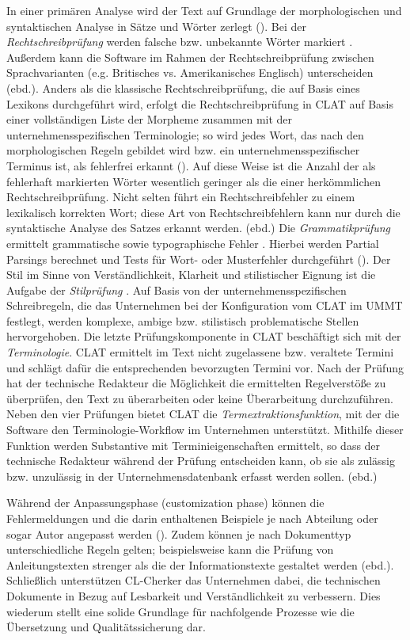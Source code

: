 In einer primären Analyse wird der Text auf Grundlage der morphologischen und syntaktischen Analyse in Sätze und Wörter zerlegt (\citealt{HallerSchütz2001}). Bei der \textit{Rechtschreibprüfung} werden falsche bzw. unbekannte Wörter markiert \citep{Rösener2010}. Außerdem kann die Software im Rahmen der Rechtschreibprüfung zwischen Sprachvarianten (e.g. Britisches vs. Amerikanisches Englisch) unterscheiden (ebd.). Anders als die klassische Rechtschreibprüfung, die auf Basis eines Lexikons durchgeführt wird, erfolgt die Rechtschreibprüfung in CLAT auf Basis einer vollständigen Liste der Morpheme zusammen mit der unternehmensspezifischen Terminologie; so wird jedes Wort, das nach den morphologischen Regeln gebildet wird bzw. ein unternehmensspezifischer Terminus ist, als fehlerfrei erkannt (\citealt{HallerSchütz2001}). Auf diese Weise ist die Anzahl der als fehlerhaft markierten Wörter wesentlich geringer als die einer herkömmlichen Rechtschreibprüfung. Nicht selten führt ein Rechtschreibfehler zu einem lexikalisch korrekten Wort; diese Art von Rechtschreibfehlern kann nur durch die syntaktische Analyse des Satzes erkannt werden. (ebd.) Die \textit{Grammatikprüfung} ermittelt grammatische sowie typographische Fehler \citep{Rösener2010}. Hierbei werden Partial Parsings berechnet und Tests für Wort- oder Musterfehler durchgeführt (\citealt{HallerSchütz2001}). Der Stil im Sinne von Verständlichkeit, Klarheit und stilistischer Eignung ist die Aufgabe der \textit{Stilprüfung} \citep{Rösener2010}. Auf Basis von der unternehmensspezifischen Schreibregeln, die das Unternehmen bei der Konfiguration vom CLAT im UMMT festlegt, werden komplexe, ambige bzw. stilistisch problematische Stellen hervorgehoben. Die letzte Prüfungskomponente in CLAT beschäftigt sich mit der \textit{Terminologie}. CLAT ermittelt im Text nicht zugelassene bzw. veraltete Termini und schlägt dafür die entsprechenden bevorzugten Termini vor. Nach der Prüfung hat der technische Redakteur die Möglichkeit die ermittelten Regelverstöße zu überprüfen, den Text zu überarbeiten oder keine Überarbeitung durchzuführen. Neben den vier Prüfungen bietet CLAT die \textit{Termextraktionsfunktion}, mit der die Software den Terminologie-Workflow im Unternehmen unterstützt. Mithilfe dieser Funktion werden Substantive mit Terminieigenschaften ermittelt, so dass der technische Redakteur während der Prüfung entscheiden kann, ob sie als zulässig bzw. unzulässig in der Unternehmensdatenbank erfasst werden sollen. (ebd.)

Während der Anpassungsphase (customization phase) können die Fehlermeldungen und die darin enthaltenen Beispiele je nach Abteilung oder sogar Autor angepasst werden (\citealt{HallerSchütz2001}). Zudem können je nach Dokumenttyp unterschiedliche Regeln gelten; beispielsweise kann die Prüfung von Anleitungstexten strenger als die der Informationstexte gestaltet werden (ebd.). Schließlich unterstützen CL-Cherker das Unternehmen dabei, die technischen Dokumente in Bezug auf Lesbarkeit und Verständlichkeit zu verbessern. Dies wiederum stellt eine solide Grundlage für nachfolgende Prozesse wie die Übersetzung und Qualitätssicherung dar.

